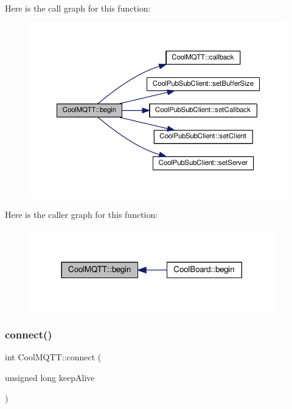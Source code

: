 Here is the call graph for this function\+:\nopagebreak
\begin{figure}[H]
\begin{center}
\leavevmode
\includegraphics[width=350pt]{d0/dd0/class_cool_m_q_t_t_ac9248808641ebf3054ed0620ea9d0100_cgraph}
\end{center}
\end{figure}
Here is the caller graph for this function\+:\nopagebreak
\begin{figure}[H]
\begin{center}
\leavevmode
\includegraphics[width=302pt]{d0/dd0/class_cool_m_q_t_t_ac9248808641ebf3054ed0620ea9d0100_icgraph}
\end{center}
\end{figure}
\mbox{\label{class_cool_m_q_t_t_a50075d0ab23a327ab897fd6adad20eda}} 
\subsubsection{\texorpdfstring{connect()}{connect()}}
{\footnotesize\ttfamily int Cool\+M\+Q\+T\+T\+::connect (\begin{DoxyParamCaption}\item[{unsigned long}]{keep\+Alive }\end{DoxyParamCaption})}

